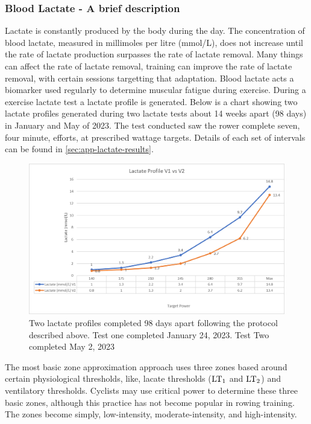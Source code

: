 \subsubsection{Blood Lactate - A brief description}
Lactate is constantly produced by the body during the day. The concentration of blood lactate, measured in millimoles per litre (mmol/L), does not increase until the rate of lactate production surpasses the rate of lactate removal. Many things can affect the rate of lactate removal, training can improve the rate of lactate removal, with certain sessions targetting that adaptation. Blood lactate acts a biomarker used regularly to determine muscular fatigue during exercise. During a exercise lactate test a lactate profile is generated. Below is a chart showing two lactate profiles generated during two lactate tests about 14 weeks apart (98 days) in January and May of 2023. The test conducted saw the rower complete seven, four minute, efforts, at prescribed wattage targets. Details of each set of intervals can be found in \ref{sec:app-lactate-results}.
\begin{figure}
  \centering
  \includegraphics[width=\linewidth]{figures/lactateGraph.png}
  \caption[Lactate Profiles from January and May 2023]{Two lactate profiles completed 98 days apart following the protocol described above. Test one completed January 24, 2023. Test Two completed May 2, 2023}
\end{figure}


The most basic zone approximation approach uses three zones based around certain physiological thresholds, like, lacate thresholds ($\textnormal{LT}_\text{1}$ and $\textnormal{LT}_\text{2}$) and ventilatory thresholds. Cyclists may use critical power to determine these three basic zones, although this practice has not become popular in rowing training. The zones become simply, low-intensity, moderate-intensity, and high-intensity. 

